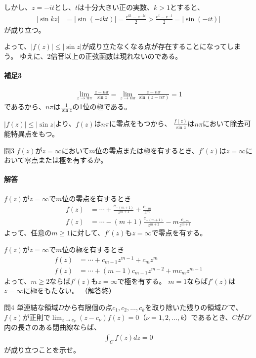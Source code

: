 しかし、$z=-it$とし、$t$は十分大きい正の実数、$k>1$とすると、
\begin{align*}
    \left|\sin kz\right|
    &=\left|\sin(-ikt)\right|
    =\frac{e^{kt}-e^{-kt}}{2}
    >\frac{e^{t}-e^{-t}}{2}
    =|\sin(-it)|
\end{align*}
が成り立つ。

よって、$|f(z)|\le|\sin z|$が成り立たなくなる点が存在することになってしまう。
ゆえに、2倍音以上の正弦函数は現れないのである。

\paragraph{補足3}
\begin{align*}
    \lim_{z\longrightarrow n\pi}\frac{z-n\pi}{\sin z}
    =\lim_{z\longrightarrow n\pi}\frac{z-n\pi}{\sin(z-n\pi)}
    =1
\end{align*}
であるから、$n\pi$は$\frac{1}{\sin z}$の1位の極である。

$|f(z)|\le|\sin z|$より、$f(z)$は$n\pi$に零点をもつから、
$\frac{f(z)}{\sin z}$は$n\pi$において除去可能特異点をもつ。


\begin{mysimplebox}{問3}
    $f(z)$が$z=\infty$において$m$位の零点または極を有するとき、$f'(z)$は$z=\infty$において零点または極を有するか。
\end{mysimplebox}
\paragraph{解答}
$f(z)$が$z=\infty$で$m$位の零点を有するとき
\begin{align*}
    f(z)&=\cdots+\frac{c_{-(m+1)}}{z^{m+1}}+\frac{c_{-m}}{z^{m}}\\
    f(z)&=\cdots-(m+1)\frac{c_{-(m+1)}}{z^{m+2}}-m\frac{c_{-m}}{z^{m+1}}
\end{align*}
よって、任意の$m\ge1$に対して、$f'(z)$も$z=\infty$で零点を有する。

$f(z)$が$z=\infty$で$m$位の極を有するとき
\begin{align*}
    f(z)&=\cdots+c_{m-1}z^{m-1}+c_mz^m\\
    f(z)&=\cdots+(m-1)c_{m-1}z^{m-2}+mc_mz^{m-1}
\end{align*}
よって、$m\ge2$ならば$f'(z)$も$z=\infty$で極を有する。
$m=1$ならば$f'(z)$は$z=\infty$に極をもたない。
（解答終）

\begin{mysimplebox}{問4}
    単連結な領域$D$から有限個の点$c_1,c_2,\dots,c_k$を取り除いた残りの領域$D'$で、$f(z)$が正則で$\lim_{z\longrightarrow c_\nu}(z-c_\nu)f(z)=0$（$\nu=1,2,\dots,k$）であるとき、$C$が$D'$内の長さのある閉曲線ならば、
    \begin{align*}
        \int_Cf(z)dz=0
    \end{align*}
    が成り立つことを示せ。
\end{mysimplebox}
